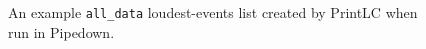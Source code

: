\begin{figure}[p]
\label{fig:example-loudest_all_data_events}
\center
{}
\caption{An example \texttt{all\_data} loudest-events list created by PrintLC when run in Pipedown.}
\end{figure}

